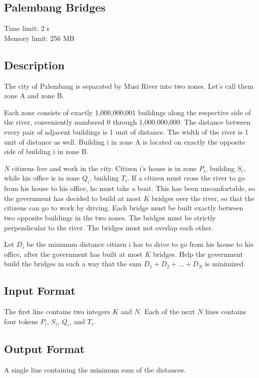 \documentclass{report}
\begin{document}
\newpage
\begin{center}
\section*{Palembang Bridges}
Time limit: 2 s\\
Memory limit: 256 MB
\end{center}

\subsection*{Description}
\indent

The city of Palembang is separated by Musi River into two zones. Let's call them zone A and zone B.

Each zone consists of exactly 1,000,000,001 buildings along the respective side of the river, conveniently numbered 0 through 1,000,000,000. The distance between every pair of adjacent buildings is 1 unit of distance. The width of the river is 1 unit of distance as well. Building i in zone A is located on exactly the opposite side of building i in zone B.

$N$ citizens live and work in the city. Citizen i's house is in zone $P_i$, building $S_i$, while his office is in zone $Q_i$, building $T_i$. If a citizen must cross the river to go from his house to his office, he must take a boat. This has been uncomfortable, so the government has decided to build at most $K$ bridges over the river, so that the citizens can go to work by driving. Each bridge must be built exactly between two opposite buildings in the two zones. The bridges must be strictly perpendicular to the river. The bridges must not overlap each other.

Let $D_i$ be the minimum distance citizen i has to drive to go from his house to his office, after the government has built at most $K$ bridges. Help the government build the bridges in such a way that the sum $D_1 + D_2 + ... + D_N$ is minimized.

\subsection*{Input Format}
The first line contains two integers $K$ and $N$. Each of the next $N$ lines contains four tokens $P_i$, $S_i$, $Q_i$, and $T_i$.

\subsection*{Output Format}
A single line containing the minimum sum of the distances.
\end{document}
